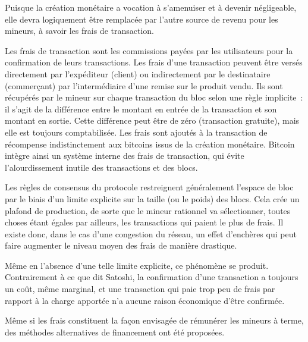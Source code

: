 Puisque la création monétaire a vocation à s'amenuiser et à devenir négligeable, elle devra logiquement être remplacée par l'autre source de revenu pour les mineurs, à savoir les frais de transaction.

Les frais de transaction sont les commissions payées par les utilisateurs pour la confirmation de leurs transactions. Les frais d'une transaction peuvent être versés directement par l'expéditeur (client) ou indirectement par le destinataire (commerçant) par l'intermédiaire d'une remise sur le produit vendu. Ils sont récupérés par le mineur sur chaque transaction du bloc selon une règle implicite~: il s'agit de la différence entre le montant en entrée de la transaction et son montant en sortie. Cette différence peut être de zéro (transaction gratuite), mais elle est toujours comptabilisée. Les frais sont ajoutés à la transaction de récompense indistinctement aux bitcoins issus de la création monétaire. Bitcoin intègre ainsi un système interne des frais de transaction, qui évite l'alourdissement inutile des transactions et des blocs.

Les règles de consensus du protocole restreignent généralement l'espace de bloc par le biais d'un limite explicite sur la taille (ou le poids) des blocs. Cela crée un plafond de production, de sorte que le mineur rationnel va sélectionner, toutes choses étant égales par ailleurs, les transactions qui paient le plus de frais. Il existe donc, dans le cas d'une congestion du réseau, un effet d'enchères qui peut faire augmenter le niveau moyen des frais de manière drastique.

Même en l'absence d'une telle limite explicite, ce phénomène se produit. Contrairement à ce que dit Satoshi, la confirmation d'une transaction a toujours un coût, même marginal, et une transaction qui paie trop peu de frais par rapport à la charge apportée n'a aucune raison économique d'être confirmée.


Même si les frais constituent la façon envisagée de rémunérer les mineurs à terme, des méthodes alternatives de financement ont été proposées. 

